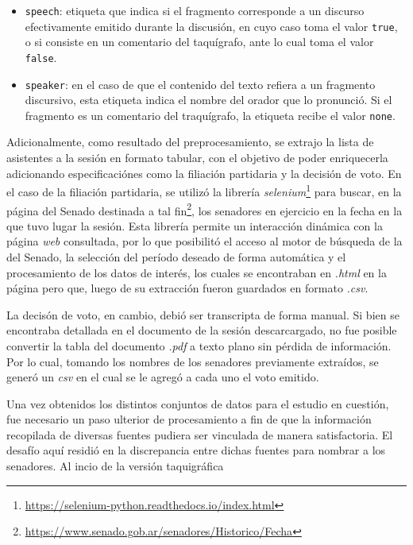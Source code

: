 \begin{itemize}
    \item \texttt{speech}: etiqueta que indica si el fragmento corresponde a un
    discurso efectivamente emitido durante la discusión, en cuyo caso toma el
    valor \texttt{true}, o si consiste en un comentario del taquígrafo, ante lo cual
    toma el valor \texttt{false}.
    \item \texttt{speaker}: en el caso de que el contenido del texto refiera a
    un fragmento discursivo, esta etiqueta indica el nombre del orador que lo
    pronunció. Si el fragmento es un comentario del traquígrafo, la etiqueta
    recibe el valor \texttt{none}.
\end{itemize}
\par
Adicionalmente, como resultado del preprocesamiento, se extrajo la lista de
asistentes a la sesión en formato tabular, con el objetivo de poder
enriquecerla adicionando especificaciónes como la filiación partidaria y la
decisión de voto. En el caso de la filiación partidaria, se utilizó la
librería \textit{selenium}\footnote{\url{https://selenium-python.readthedocs.io/index.html}}
para buscar, en la {p\'agina} del Senado destinada a tal
fin\footnote{\url{https://www.senado.gob.ar/senadores/Historico/Fecha}},
los senadores en ejercicio en la fecha en la que tuvo lugar la sesión.
Esta librería permite un interacción dinámica con la página \textit{web} consultada,
por lo que posibilitó el acceso al motor de búsqueda de la del Senado, la selección
del período deseado de forma automática y el procesamiento de los datos de interés,
los cuales se encontraban en \textit{.html} en la página pero que, luego de su
extracci\'on fueron guardados en formato \textit{.csv}.
\par
La decisón de voto, en cambio, debió ser transcripta de forma manual. Si bien
se encontraba detallada en el documento de la sesión descarcargado, no fue posible
convertir la tabla del documento \textit{.pdf} a texto plano sin pérdida de información.
Por lo cual, tomando los nombres de los senadores previamente extra\'idos, se gener\'o
un \textit{csv} en el cual se le agregó a cada uno el voto emitido.
\par
Una vez obtenidos los distintos conjuntos de datos para el estudio en cuestión,
fue necesario un paso ulterior de procesamiento a fin de que la información
recopilada de diversas fuentes pudiera ser vinculada de manera
satisfactoria. El desaf\'io aqu\'i residi\'o en la discrepancia entre
dichas fuentes para nombrar a los senadores. Al incio de la versión taquigráfica
